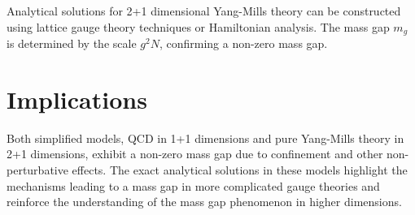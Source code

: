 Analytical solutions for 2+1 dimensional Yang-Mills theory can be constructed using lattice gauge theory techniques or Hamiltonian analysis. The mass gap \(m_g\) is determined by the scale \(g^2N\), confirming a non-zero mass gap.



\section{Implications}

Both simplified models, QCD in 1+1 dimensions and pure Yang-Mills theory in 2+1 dimensions, exhibit a non-zero mass gap due to confinement and other non-perturbative effects. The exact analytical solutions in these models highlight the mechanisms leading to a mass gap in more complicated gauge theories and reinforce the understanding of the mass gap phenomenon in higher dimensions.
